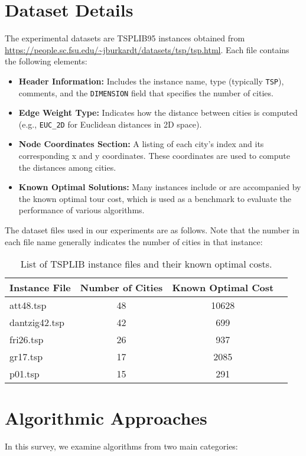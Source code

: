 \documentclass[11pt]{article}
\begin{document}
	\section{Dataset Details}
	The experimental datasets are TSPLIB95 instances obtained from \url{https://people.sc.fsu.edu/~jburkardt/datasets/tsp/tsp.html}. Each file contains the following elements:
	\begin{itemize}[noitemsep]
		\item \textbf{Header Information:} Includes the instance name, type (typically \texttt{TSP}), comments, and the \texttt{DIMENSION} field that specifies the number of cities.
		\item \textbf{Edge Weight Type:} Indicates how the distance between cities is computed (e.g., \texttt{EUC\_2D} for Euclidean distances in 2D space).
		\item \textbf{Node Coordinates Section:} A listing of each city's index and its corresponding x and y coordinates. These coordinates are used to compute the distances among cities.
		\item \textbf{Known Optimal Solutions:} Many instances include or are accompanied by the known optimal tour cost, which is used as a benchmark to evaluate the performance of various algorithms.
	\end{itemize}
	
	The dataset files used in our experiments are as follows. Note that the number in each file name generally indicates the number of cities in that instance:

	
	\begin{table}[H]
		\centering
		\begin{tabular}{lccc}
			\toprule
			Instance File    & Number of Cities & Known Optimal Cost \\
			\midrule
			att48.tsp      & 48              & 10628 \\
			dantzig42.tsp  & 42              & 699 \\
			fri26.tsp      & 26              & 937 \\
			gr17.tsp       & 17              & 2085 \\
			p01.tsp        & 15              & 291 \\
			\bottomrule
		\end{tabular}
		\caption{List of TSPLIB instance files and their known optimal costs.}
		\label{table:tsplib}
	\end{table}
	
	\section{Algorithmic Approaches}
	In this survey, we examine algorithms from two main categories:
	
\end{document}
